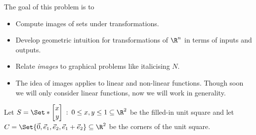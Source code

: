 \documentclass{problemset}
\begin{document}
	\question
	\begin{annotation}
		\begin{goals}

			The goal of this problem is to
			\begin{itemize}
				\item Compute images of sets under transformations.
				\item Develop geometric intuition for transformations of $\R^n$
					in terms of inputs and outputs.
				\item Relate \emph{images} to graphical problems like italicising $N$.
			\end{itemize}
		\end{goals}

		\begin{notes}
			\begin{itemize}
				\item The idea of images applies to linear and non-linear functions.
					Though soon we will only consider linear functions, now
					we will work in generality.
			\end{itemize}
		\end{notes}
	\end{annotation}
	Let $S=\Set*{\mat{x\\y} \given 0\leq x,y\leq 1}\subseteq \R^2$ be the filled-in unit
	square and let $C=\Set{\vec 0, \xhat,\yhat,\xhat+\yhat}\subseteq \R^2$
	be the corners of the unit square.
\end{document}
